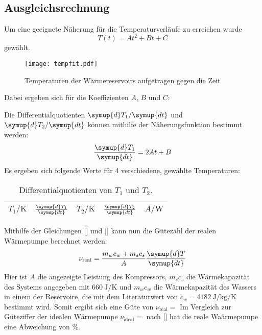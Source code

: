 \subsection{Ausgleichsrechnung}
Um eine geeignete Näherung für die Temperaturverläufe zu erreichen wurde
\begin{equation}
  \label{eq:tempfit}
  T(t) = At^2 + Bt + C
\end{equation}
gewählt.
\begin{figure}[H]
  \centering
  \texttt{[image: tempfit.pdf]}
  \caption{Temperaturen der Wärmereservoirs aufgetragen gegen die Zeit}
  \label{fig:tempfit}
\end{figure}
Dabei ergeben sich für die Koeffizienten $A$, $B$ und $C$:

Die Differentialquotienten $\symup{d}T_1/\symup{dt}$ und $\symup{d}T_2/\symup{dt}$ können mithilfe der Näherungsfunktion 
bestimmt werden:
\begin{equation}
    \frac{\symup{d}T_1}{\symup{dt}} = 2At + B
\end{equation}
Es ergeben sich folgende Werte für 4 verschiedene, gewählte Temperaturen:
\begin{table}[H]
    \centering
    \caption{Differentialquotienten von $T_1$ und $T_2$.}
    \label{tab:t2}
    \begin{tabular}{S S S S S}
        \toprule
        {$T_1/\si{\kelvin}$} & {$\frac{\symup{d}T_1}{\symup{dt}}$} & {$T_2/\si{\kelvin}$} & {$\frac{\symup{d}T_2}{\symup{dt}}$} & {$A/\si{\watt}$} \\
        \midrule
%
        \bottomrule
    \end{tabular}
\end{table}
Mithilfe der Gleichungen \eqref{} und \eqref{} kann nun die Gütezahl der realen Wärmepumpe berechnet werden:
\begin{equation}
    \nu_\text{real} = \frac{m_wc_w + m_sc_s}{A}\frac{\symup{d}T}{\symup{dt}}
\end{equation}
Hier ist $A$ die angezeigte Leistung des Kompressors, $m_sc_s$ die Wärmekapazität des Systems angegeben mit 
$\SI{660}{\joule\per\kelvin}$ und $m_wc_w$ die Wärmekapazität des Wassers in einem der Reservoire, die mit dem Literaturwert 
von $c_w = \SI{4182}{\joule\per\kilogram\per\kelvin}$ bestimmt wird.
Somit ergibt sich eine Güte von $\nu_\text{real} = $
Im Vergleich zur Güteziffer der idealen Wärmepumpe $\nu_\text{ideal} = $ nach \eqref{} hat die reale Waärmepumpe eine 
Abweichung von \%.
